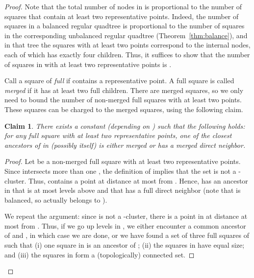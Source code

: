 \documentclass[11pt]{paper}
\newtheorem {claim}[theorem] {Claim}
\begin{document}
      \begin{proof}
      Note that the total number of nodes in  is
      proportional to the number of 
      squares that contain at least two representative points.
      Indeed, the number of squares in a balanced regular quadtree
      is proportional to the number of squares in the corresponding 
      unbalanced regular quadtree (Theorem~\ref{thm:balance}), and in that tree 
      the squares with
      at least two points correspond to the internal nodes, each
      of which has exactly four children.
      Thus, it suffices to 
      show that the number of squares in  with at least two representative 
      points is .

      Call a square  of  \emph{full} if  contains a representative
      point. 
      A full square  is called \emph{merged} if it has
      at least two full children.  There are
       merged squares, so 
      we only need to bound the number of non-merged full squares
      with at least two points. 
      These squares can be charged to the merged squares,
      using the following claim.
     
      \begin{claim}\label{clm:merged_ancestor}
       There exists a constant  (depending on ) such
       that the following holds:
      for any full square  with at least two representative points,
      one of the  closest ancestors of 
      in  (possibly  itself) is either merged or 
      has a merged direct neighbor.
      \end{claim}
      \begin{proof}
      Let  be a non-merged full square with at least two representative points.
      Since  intersects more than one , the definition of
       implies that the set 
       is not a -cluster. Thus, 
       contains a point at distance at most  from .
      Hence,  has an ancestor  in  that is at most
       levels above  and that has a full direct 
      neighbor  (note that  is balanced, so 
       actually belongs to ). 

      We repeat the argument: since
       is not a -cluster, there is a point in
       at distance
      at most  from . Thus, if we go up
       levels in , we either encounter a common ancestor
      of  and , in which case we are done, or we have found
      a set  of
      three full squares of  such that (i) one square in
       is an ancestor of ; (ii) the squares in 
      have equal size;  and (iii) the squares in  
      form a (topologically) connected set.


\end{proof}
\end{proof}
\end{document}
